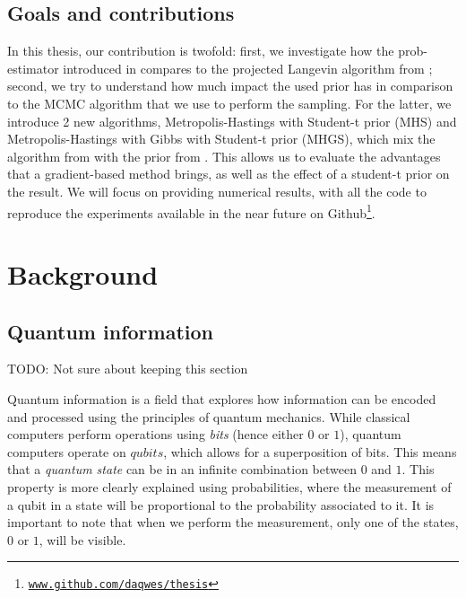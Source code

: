 \documentclass[12pt]{memoir}
\begin{document}






\section{Goals and contributions}
In this thesis, our contribution is twofold: first, we investigate how the prob-estimator introduced in \cite{MA17} compares to the projected Langevin algorithm from \cite{meth:bayesian:Langevin:ACMT2024}; second, we try to understand how much impact the used prior has in comparison to the MCMC algorithm that we use to perform the sampling. For the latter, we introduce 2 new algorithms, Metropolis-Hastings with Student-t prior (MHS) and Metropolis-Hastings with Gibbs with Student-t prior (MHGS), which mix the algorithm from \cite{MA17} with the prior from \cite{meth:bayesian:Langevin:ACMT2024}. This allows us to evaluate the advantages that a gradient-based method brings, as well as the effect of a student-t prior on the result. We will focus on providing numerical results, with all the code to reproduce the experiments available in the near future on Github\footnote{\texttt{\url{www.github.com/daqwes/thesis}}}.
\chapter{Background}

\section{Quantum information}
TODO: Not sure about keeping this section \medbreak

Quantum information is a field that explores how information can be encoded and processed using the principles of quantum mechanics. While classical computers perform operations using \textit{bits} (hence either $0$ or $1$), quantum computers operate on $qubits$, which allows for a superposition of bits. This means that a \textit{quantum state} can be in an infinite combination between $0$ and $1$. This property is more clearly explained using probabilities, where the measurement of a qubit in a state will be proportional to the probability associated to it. It is important to note that when we perform the measurement, only one of the states, $0$ or $1$, will be visible.\medskip
\end{document}
